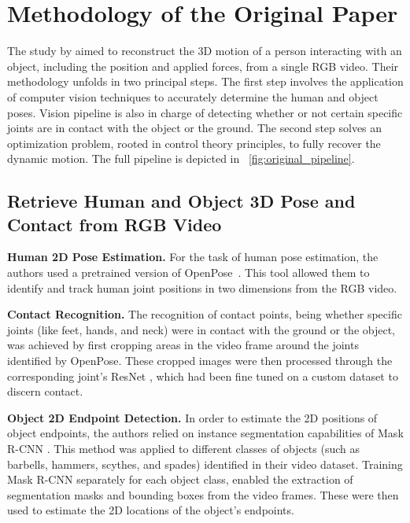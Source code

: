 \section{Methodology of the Original Paper}
\label{sec:methodo_paper}

The study by \citet{li2019estimating} aimed to reconstruct the 3D motion of a person interacting with an object, including the position 
and applied forces, from a single RGB video. Their methodology unfolds in two principal steps. The first step involves the application of 
computer vision techniques to accurately determine the human and object poses. 
Vision pipeline is also in charge of detecting whether or not certain specific joints are in contact with the object or the ground.
The second step solves an optimization problem, rooted in control theory principles, to fully recover the dynamic motion. 
The full pipeline is depicted in ~\cref{fig:original_pipeline}.


\subsection{Retrieve Human and Object 3D Pose and Contact from RGB Video}
\label{subsec:retrieve_original}



\noindent\textbf{Human 2D Pose Estimation.}\label{2dpose} For the task of human pose estimation, the authors used a pretrained version of 
OpenPose~\cite{cao2017realtime}. This tool allowed them to identify and track human joint positions in two dimensions from the RGB video.

\noindent\textbf{Contact Recognition.} The recognition of contact points, being whether specific joints (like feet, hands, and neck) were in 
contact with the ground or the object, was achieved by first cropping areas in the video frame around the joints identified by OpenPose. 
These cropped images were then processed through the corresponding joint's ResNet \cite{he2016deep}, which had been fine tuned on a custom dataset 
to discern contact.

\noindent\textbf{Object 2D Endpoint Detection.} In order to estimate the 2D positions of object endpoints, the authors relied on instance segmentation 
capabilities of Mask R-CNN \cite{he2017mask}. This method was applied to different classes of objects (such as barbells, hammers, scythes, 
and spades) identified in their video dataset. Training Mask R-CNN separately for each object class, enabled the extraction of segmentation masks
and bounding boxes from the video frames. These were then used to estimate the 2D locations of the object's endpoints.

